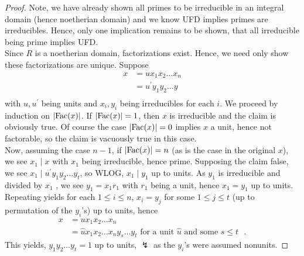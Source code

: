\begin{proof}
	Note, we have already shown all primes to be irreducible in an integral domain (hence noetherian domain) and we know UFD implies primes are irreducibles. Hence, only one implication remains to be shown, that all irreducible being prime implies UFD.\\
	Since \(R\) is a noetherian domain, factorizations exist. Hence, we need only show these factorizations are unique. Suppose
	\begin{align*}
		x &= u x_1 x_2 \ldots x_{n}\\
		&= u^{\prime} y_1 y_2 \ldots y\text{} \\
	\end{align*} with \(u, u^{\prime}\) being units and \(x_i, y_{i}\) being irreducibles for each \(i\). We proceed by induction on \(\left| \operatorname{Fac}(x) \right| \). If \(\left| \operatorname{Fac}(x) \right| =1\), then \(x\) is irreducible and the claim is obviously true. Of course the case \(\left| \operatorname{Fac}(x) \right| = 0\) implies \(x\) a unit, hence not factorable, so the claim is vacuously true in this case.\\
	Now, assuming the case \(n-1\), if \(\left| \operatorname{Fac}(x) \right| = n\) (as is the case in the original \(x\)), we see \(x_1 \mid x\) with \(x_1\) being irreducible, hence prime. Supposing the claim false, we see \(x_1 \mid u^{\prime} y_1 y_2 \ldots y_{t}\), so WLOG, \(x_1 \mid y_1\) up to units. As \(y_1\) is irreducible and divided by \(x_1\) , we see \(y_1 = x_1 r_1\) with \(r_1\) being a unit, hence \(x_1 = y_1\) up to units. Repeating yields for each \(1 \le i \le n\), \(x_{i} = y_{j}\) for some \(1 \le j \le t\)  (up to permutation of the \(y_{i}\)'s) up to units, hence
	\begin{align*}
		x &=  u x_1 x_2 \ldots x_{n} \\
		&=  \hat{u}x_1 x_2 \ldots x_{n} y_{s} \ldots y_{t} \text{ for a unit } \hat{u} \text{ and some \(s \le t\) }
	.\end{align*}
	This yields, \(y_1 y_2 \ldots y_{t} = 1\) up to units, \(\lightning\) as the \(y_{i}\)'s were assumed nonunits.
\end{proof}
